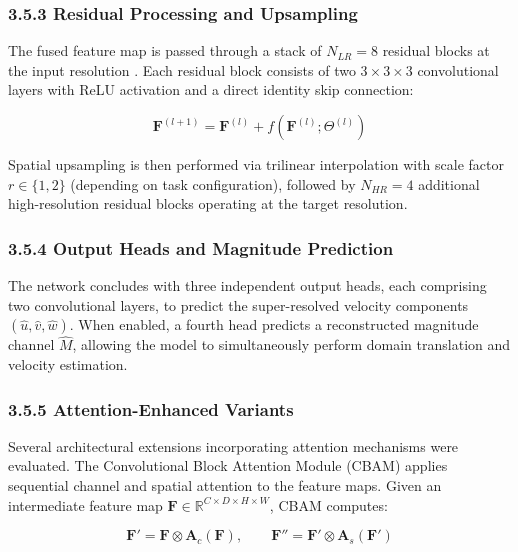 \subsubsection*{3.5.3 Residual Processing and Upsampling}

The fused feature map is passed through a stack of $N_{LR} = 8$ residual blocks at the input resolution \cite{he2016resnet}. Each residual block consists of two $3\times3\times3$ convolutional layers with ReLU activation and a direct identity skip connection:

\begin{equation}
    \mathbf{F}^{(l+1)} = \mathbf{F}^{(l)} + f\left(\mathbf{F}^{(l)}; \Theta^{(l)}\right)
\end{equation}

Spatial upsampling is then performed via trilinear interpolation with scale factor $r \in \{1, 2\}$ (depending on task configuration), followed by $N_{HR} = 4$ additional high-resolution residual blocks operating at the target resolution.

\subsubsection*{3.5.4 Output Heads and Magnitude Prediction}

The network concludes with three independent output heads, each comprising two convolutional layers, to predict the super-resolved velocity components $(\hat{u}, \hat{v}, \hat{w})$. When enabled, a fourth head predicts a reconstructed magnitude channel $\hat{M}$, allowing the model to simultaneously perform domain translation and velocity estimation.

\subsubsection*{3.5.5 Attention-Enhanced Variants}

Several architectural extensions incorporating attention mechanisms were evaluated. The Convolutional Block Attention Module (CBAM) \cite{woo2018cbam} applies sequential channel and spatial attention to the feature maps. Given an intermediate feature map $\mathbf{F} \in \mathbb{R}^{C \times D \times H \times W}$, CBAM computes:

\begin{equation}
    \mathbf{F}' = \mathbf{F} \otimes \mathbf{A}_c(\mathbf{F}), \qquad
    \mathbf{F}'' = \mathbf{F}' \otimes \mathbf{A}_s(\mathbf{F}')
\end{equation}

